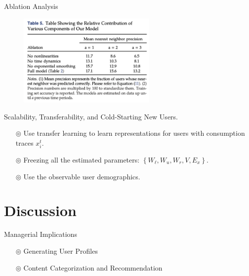 \documentclass{beamer}
\begin{document}
\begin{frame}{Ablation Analysis}
	\begin{figure}[htpb]
		\centering
		\includegraphics[width=0.6\textwidth]{pic/Ablation.png}
	\end{figure}
\end{frame}

\begin{frame}{Scalability, Transferability, and Cold-Starting New Users.}
	\begin{itemize}
		\item[$\circledcirc$] Use transfer learning to learn representations for users with consumption traces $x_{i}^{t}$.
		\item[$\circledcirc$] Freezing all the estimated parameters: $\left\{W_{\ell}, W_u, W_r, V, E_x\right\}$.
		\item[$\circledcirc$] Use the observable user demographics.
	\end{itemize}
\end{frame}

\section{Discussion}

\begin{frame}{Managerial Implications}
	\begin{itemize}
		\item[$\circledcirc$] Generating User Profiles
		\item[$\circledcirc$] Content Categorization and Recommendation
	\end{itemize}
\end{frame}
\end{document}
